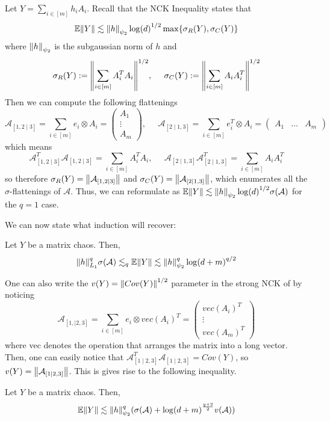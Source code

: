 Let $Y = \sum_{i \in [m]} h_i A_i$. Recall that the NCK Inequality \cite{Pisier_2003} states that 
\[  \mathbb{E} \norm{Y} \lesssim \norm{h}_{\psi_2} \log(d)^{1/2} \max\{\sigma_R(Y), \sigma_C(Y)\} \]
where $\norm{h}_{\psi_2}$ is the subgaussian norm of $h$ and
\[ \sigma_R(Y) := \norm{\sum_{i \in [m]} A_i^T A_i}^{1/2}, \;\;\;\;\; \sigma_C(Y) := \norm{\sum_{i \in [m]} A_i A_i^T}^{1/2} \]
Then we can compute the following flattenings
\[ \mathcal{A}_{[1, 2 \mid 3]} = \sum_{i \in [m]} e_i \otimes A_i = \begin{pmatrix}
    A_1 \\ \vdots \\ A_m
\end{pmatrix}, \;\;\;\;\; \mathcal{A}_{[2 \mid 1, 3]} = \sum_{i \in [m]} e_i^T \otimes A_i = \begin{pmatrix} A_1 & \dots & A_m \end{pmatrix} \]
which means
\[ \mathcal{A}_{[1, 2 \mid 3]}^T \mathcal{A}_{[1, 2 \mid 3]} = \sum_{i \in [m]} A_i^T A_i, \; \;\;\;\;\mathcal{A}_{[2 \mid 1, 3]} \mathcal{A}_{[2 \mid 1, 3]}^T = \sum_{i \in [m]} A_i A_i^T  \]
so therefore $\sigma_R(Y) = \norm{\mathcal{A}_{[1, 2 \mid 3]}}$ and $\sigma_C(Y) = \norm{\mathcal{A}_{[2 \mid 1,3]}}$,
which enumerates all the $\sigma$-flattenings of $\mathcal{A}$. Thus, we can reformulate as $\mathbb{E} \norm{Y} \lesssim \norm{h}_{\psi_2} \log(d)^{1/2} \sigma(\mathcal{A})$
for the $q = 1$ case.

We can now state what induction will recover:
\begin{theorem}
    Let $Y$ be a matrix chaos. Then,
    \[ \norm{h}_{L_1}^q \sigma(\mathcal{A}) \lesssim_q \mathbb{E} \norm{Y} \lesssim \norm{h}_{\psi_2}^q \log(d + m)^{q/2} \]
\end{theorem}
One can also write the $v(Y) = \norm{Cov(Y)}^{1/2}$ parameter in the strong NCK of \cite{Bandeira_2023}
by noticing
\[ \mathcal{A}_{[1, \mid 2, 3]} = \sum_{i \in [m]} e_i \otimes vec(A_i)^T = \begin{pmatrix}
    vec(A_i)^T \\ \vdots \\ vec(A_m)^T
\end{pmatrix} \]
where vec denotes the operation that arranges the matrix into a long vector.
Then, one can easily notice that $\mathcal{A}^T_{[1 \mid 2, 3]} \mathcal{A}_{[1 \mid 2,3]} = Cov(Y)$,
so $v(Y) = \norm{\mathcal{A}_{[1 \mid 2, 3]}}$. This is gives rise to the following inequality.
\begin{theorem}
    Let $Y$ be a matrix chaos. Then,
    \[ \mathbb{E} \norm{Y} \lesssim \norm{h}_{\psi_2}^q(\sigma(\mathcal{A}) + \log(d + m)^{\frac{q + 2}{2}} v(\mathcal{A})) \]
\end{theorem}

